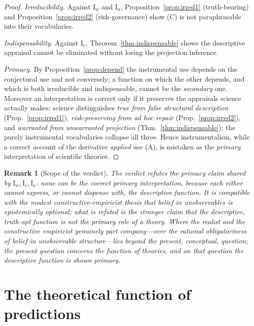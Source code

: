 \documentclass{amsart}
\theoremstyle{definition}
\theoremstyle{plain}
\newtheorem{remark}{Remark}
\begin{document}
\begin{proof}
\emph{Irreducibility.} Against $\mathrm I_w$ and $\mathrm I_a$,
Proposition~\ref{prop:irred1} (truth-bearing) and
Proposition~\ref{prop:irred2} (risk-governance) show (C) is not paraphrasable
into their vocabularies.

\emph{Indispensability.} Against $\mathrm I_e$,
Theorem~\ref{thm:indispensable} shows the descriptive appraisal cannot be
eliminated without losing the projection inference.

\emph{Primacy.} By Proposition~\ref{prop:depend} the instrumental use depends on
the conjectural use and not conversely; a function on which the other depends,
and which is both irreducible and indispensable, cannot be the \emph{secondary}
one. Moreover an interpretation is correct only if it preserves the appraisals
science actually makes: science distinguishes \emph{true from false structural
description} (Prop.~\ref{prop:irred1}), \emph{risk-preserving from ad hoc
repair} (Prop.~\ref{prop:irred2}), and \emph{warranted from unwarranted
projection} (Thm.~\ref{thm:indispensable}); the purely instrumental
vocabularies collapse all three. Hence instrumentalism, while a correct account
of the derivative \emph{applied} use (A), is mistaken as the \emph{primary}
interpretation of scientific theories.
\end{proof}

\begin{remark}[Scope of the verdict]\label{rem:scope}
The verdict refutes the \emph{primacy} claim shared by $\mathrm I_w,\mathrm
I_e,\mathrm I_a$: none can be the correct primary interpretation, because each
either cannot express, or cannot dispense with, the descriptive function. It is
compatible with the modest constructive-empiricist thesis that \emph{belief} in
unobservables is epistemically optional; what is refuted is the stronger claim
that the descriptive, truth-apt function is not the \emph{primary} role of a
theory. Where the realist and the constructive empiricist genuinely part
company---over the \emph{rational obligatoriness} of belief in unobservable
structure---lies beyond the present, conceptual, question; the present question
concerns the \emph{function} of theories, and on that question the descriptive
function is shown primary.
\end{remark}

\section{The theoretical function of predictions}
\end{document}
